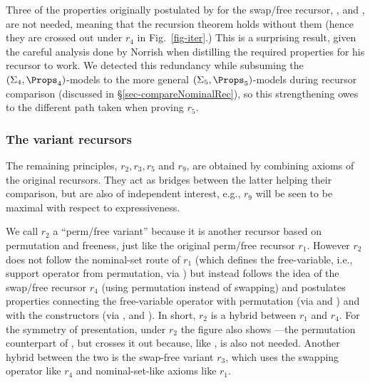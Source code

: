 Three of the %
properties %
originally postulated by  
\citet{primrecFOAS-Norrish04} %
for the swap/free recursor, \SwId{}, \SwIv{} and \FvSw{}, are not needed, meaning that the recursion theorem holds without them (hence they are crossed out under $r_4$ in Fig.~\ref{fig-iter}.) 
%
This is a surprising result, given the %
careful analysis done by Norrish  
when distilling the required properties for his recursor to work. %
%
We detected this redundancy while subsuming the $(\Sigma_4,\Props_4)$-models %
to the more general $(\Sigma_5,\Props_5)$-models %
during recursor comparison (discussed in \S\ref{sec-compareNominalRec}), so this strengthening %
owes to the different %
path 
taken when %
proving $r_5$. 




\subsubsection{%
	The variant recursors}  
\label{subsubsec-crossPolliRecs}
%
The remaining principles, $r_2,r_3,r_5$ and $r_9$, are obtained by combining  
axioms of the original recursors. They %
act as bridges between the latter %
helping their comparison, 
but are also of independent interest, e.g., $r_9$ will %
be seen to be maximal with respect to expressiveness. 

We call $r_2$ a ``perm/free variant'' because it is another recursor based on permutation and freeness, just like the original perm/free recursor $r_1$.  However $r_2$ does not follow the nominal-set route of $r_1$ (which defines the free-variable, i.e., support operator from permutation, via \FvDPm{}) but instead follows the idea of the swap/free recursor $r_4$ (using permutation instead of swapping) and postulates properties connecting the free-variable operator with  permutation (via \PmFv{} and \FvPm{}) and with the constructors (via \FvVr{}, \FvAp{} and \FvLm{}). In short, $r_2$ is a hybrid between $r_1$ and $r_4$. For the symmetry of presentation, under $r_2$ the figure also shows \FvPm{}---the permutation counterpart of \FvSw{}, but crosses it out because, like \FvSw{}, is also not needed. %
%
Another %
hybrid between the two is the swap-free variant $r_3$, which uses the swapping operator like $r_4$ and nominal-set-like axioms like $r_1$.  


